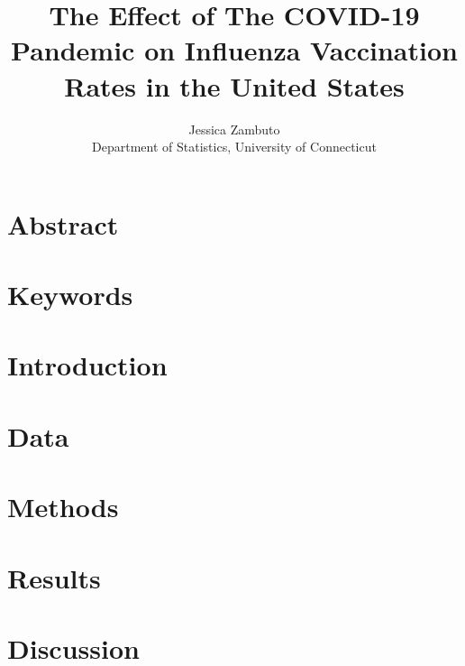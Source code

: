 \documentclass[12pt]{article}
\title{The Effect of The COVID-19 Pandemic on Influenza Vaccination Rates in the United States}
\author{Jessica Zambuto\\
Department of Statistics, University of Connecticut}
\begin{document}
\maketitle
\section*{Abstract}
\label{sec:Abstract}
\section*{Keywords}
\label{sec:Keywords}
\section{Introduction}
\label{sec:Introduction}
\section{Data}
\label{sec:data}
\section{Methods}
\label{sec:Methods}
\section{Results}
\label{sec:Results}
\section{Discussion}
\label{sec:Discussion}


\end{document}
